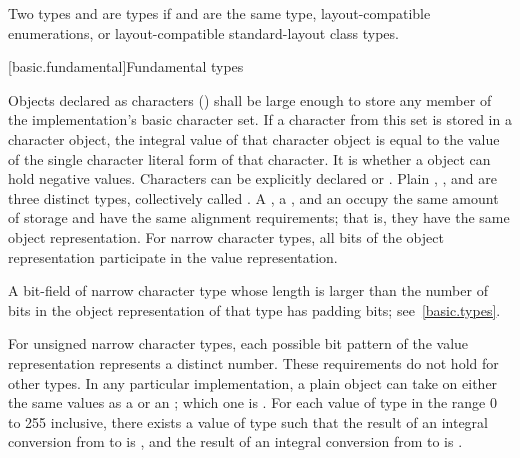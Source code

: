\pnum
{}%
Two types   and   are
 types
if  and  are the same type,
layout-compatible enumerations, or
layout-compatible standard-layout class types.

[basic.fundamental]{Fundamental types}

\pnum
{}%
%
%
%
%
%
%
Objects declared as characters () shall be large enough to
store any member of the implementation's basic character set. If a
character from this set is stored in a character object, the integral
value of that character object is equal to the value of the single
character literal form of that character. It is 
whether a  object can hold negative values.
%
%
%
Characters can be explicitly declared  or
.
%
Plain , , and  are
three distinct types, collectively called
.
A , a , and an
 occupy the same amount of storage and have the
same alignment requirements; that is, they have the
same object representation. For narrow character types, all bits of the object
representation participate in the value representation.
\begin{note}
A bit-field of narrow character type whose length is larger than
the number of bits in the object representation of that type has
padding bits; see~\ref{basic.types}.
\end{note}
For unsigned narrow
character types, each possible bit pattern of the value representation
represents a distinct number. These requirements do not hold for other types. In
any particular implementation, a plain  object can take on
either the same values as a  or an ; which one is .
For each value  of type  in the range
0 to 255 inclusive, there exists a value  of type
 such that the result of an integral
conversion from  to  is
, and the result of an integral conversion from
 to  is .

